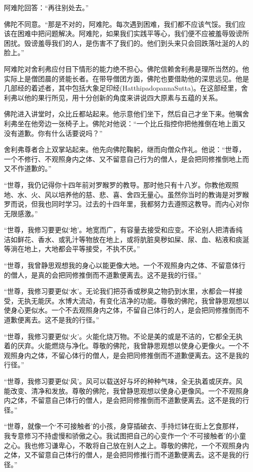 \documentclass[12pt,twoside,openany]{book}
\begin{document}
阿难陀回答：“再往别处去。”

佛陀不同意。“那是不对的，阿难陀。每次遇到困难，我们都不应该气馁。我们应该在困难中把问题解决。阿难陀，如果我们实践平等心，我们便不应被羞辱毁谤所困扰。毁谤羞辱我们的人，是伤害不了我们的。他们到头来只会回跌落吐涎的人的脸上。”

阿难陀对舍利弗应付目下情形的能力绝不担心。佛陀信赖舍利弗是理所当然的。他实际上是僧团晨的贤能长者。在带导僧团方面，佛陀也要借助他的深思远见。他是几部经的着述者，其中包括大象足印经(HatthipadopannaSutta)。在这部经里，舍利弗以他的果行所见，用十分创新的角度来讲说四大原素与五蕴的关系。

佛陀进入讲堂时，众比丘都站起来。他示意他们坐下，然后自己才坐下来。他嘱舍利弗坐在他旁边一张椅子上。佛陀对他说：“一个比丘指控你把他推倒在地上面又没有道歉。你有什么话要说吗？”

舍利弗尊者合上双掌站起来。他先向佛陀鞠躬，继而向僧众作礼。他说：“世尊，一个不修行、不观照身内之体、又不留意自己行为的僧人，是会把同修推倒地上而又不作道歉的。”

“世尊，我仍记得你十四年前对罗睺罗的教导。那时他只有十八岁。你教他观照地、水、火、风以培养他的慈、悲、喜、舍四无量心。虽然你当时的教诲是对罗睺罗而说，但我也同时学习。过去的十四年里，我都努力去遵照这教导。而内心对你无限感激。”

“世尊，我修习要更似‘地’。地宽而广，有容量去接受和应变。不论别人把清香纯洁如鲜花、香水、或乳汁等物放在地上，或将肮脏臭秽如屎、尿、血、粘液和痰涎等淌在地上，大地都会平等接受，不执不厌。”

“世尊，我曾静思观想我的身心以能更像大地。一个不观照身内之体、不留意体行的僧人，是真的会把同修推倒而不道歉便离去。这不是我的行径。”

“世尊，我修习要更似‘水’。无论我们把芬香或秽臭之物扔到水里，水都会一样接受，无执无能厌。水博大流动，有变化洁净的功能。尊敬的佛陀，我曾静思观想以使身心更似水。一个不去观照身内之体，不留自己体行的人，是会把同修推倒而不道歉便离去。这不是我的行径。”

“世尊，我修习要更似‘火’。火能化烧万物。不论是美的或是不洁的，它都全无执着的厌弃。火能燃烧与净化。尊敬的佛陀，我曾静思观想以使身心更像火。一个不观照身内之体，不留心体行的僧人，是会把同修推倒而不道歉便离去。这不是我的行径。”

“世尊，我修习要更似‘风’。风可以载送好与坏的种种气味，全无执着或厌弃。风能改变、清净和发放。尊敬的佛陀，我曾静思观想以使身心更像风。一个不观照身内之体，不留意自己体行的僧人，是会把同修推倒而不道歉便离去。这不是我的行径。”

“世尊，就像一个‘不可接触者’的小孩，身穿插破衣、手持烂钵在街上乞食那样，我专意修习不持虚慢和骄傲之心。我试图把自己的心变作一个‘不可接触者’的小童之心。我也修习谦卑心，不敢将自己放在别人之上。尊敬的佛陀，一个不观照身内之体，又不留意自己体行的僧人，是会把同修推行而不道歉便离去。这不是我的行径。”
\end{document}
